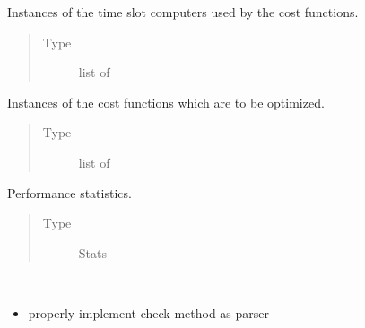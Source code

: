 \documentclass[letterpaper,10pt,english]{sphinxmanual}
\begin{document}
\begin{fulllineitems}
\begin{fulllineitems}
\label{\detokenize{qsim:qsim.simulator.Simulator.solvers}}
Instances of the time slot computers used by the cost functions.
\begin{quote}\begin{description}
\item[{Type}] \leavevmode
list of 

\end{description}\end{quote}

\end{fulllineitems}


\begin{fulllineitems}
\label{\detokenize{qsim:qsim.simulator.Simulator.cost_fktns}}
Instances of the cost functions which are to be optimized.
\begin{quote}\begin{description}
\item[{Type}] \leavevmode
list of 

\end{description}\end{quote}

\end{fulllineitems}


\begin{fulllineitems}
\label{\detokenize{qsim:qsim.simulator.Simulator.stats}}
Performance statistics.
\begin{quote}\begin{description}
\item[{Type}] \leavevmode
Stats

\end{description}\end{quote}

\end{fulllineitems}


\begin{fulllineitems}
\label{\detokenize{qsim:qsim.simulator.Simulator.TODO}}~\begin{itemize}
\item {} 
properly implement check method as parser


\end{itemize}
\end{fulllineitems}
\end{fulllineitems}
\end{document}
